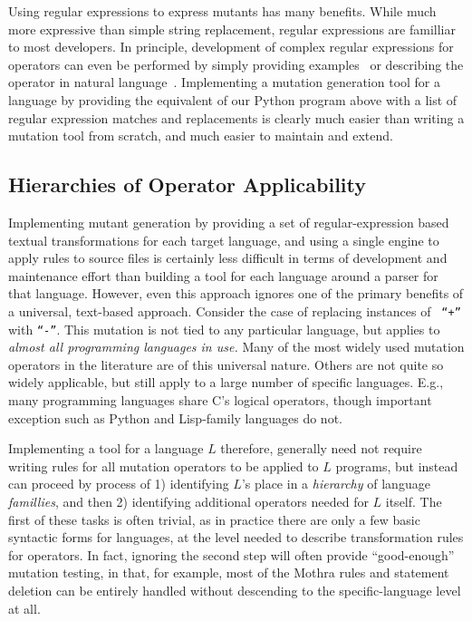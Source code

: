 \documentclass[sigconf,review, anonymous]{acmart}
\begin{document}
Using regular expressions to express mutants has many benefits.  While
much more expressive than simple string replacement, regular
expressions are familliar to most developers.  In principle,
development of complex regular expressions for operators can even be
performed by simply providing examples~\cite{bartoli2014automatic}  or
describing the operator in natural
language~\cite{zhong2018generating}.  Implementing a mutation
generation tool for a language by providing the equivalent of our
Python program above with a list of regular expression matches and
replacements is clearly much easier than writing a mutation tool from
scratch, and much easier to maintain and extend. 

\subsection{Hierarchies of Operator Applicability}

Implementing mutant generation by providing a set of regular-expression
based textual transformations for each target language, and using a
single engine to apply rules to source files is certainly less
difficult in terms of development and maintenance effort than building
a tool for each language around a parser for that language.  However,
even this approach ignores one of the primary benefits of a universal,
text-based approach.  Consider the case of replacing instances of {\tt
  ``+''}  with {\tt ``-''}.  This mutation is not tied to any
particular language, but applies to \emph{almost all programming
  languages in use.}  Many of the most widely used mutation operators
in the literature are of this universal nature.  Others are not quite
so widely applicable, but still apply to a large number of specific
languages.  E.g., many programming languages share C's logical
operators, though important exception such as Python and Lisp-family
languages do not.

Implementing a tool for a language $L$ therefore, generally need not
require writing rules for all mutation operators to be applied to $L$
programs, but instead can proceed by process of 1) identifying $L$'s
place in a \emph{hierarchy} of language \emph{famillies}, and then 2)
identifying additional operators needed for $L$ itself.  The first of
these tasks is often trivial, as in practice there are only a few
basic syntactic forms for languages, at the level needed to describe
transformation rules for operators.  In fact, ignoring the second step
will often provide ``good-enough'' mutation testing, in that, for
example, most of the Mothra rules and statement deletion can be
entirely handled without descending to the specific-language level at all.
\end{document}
